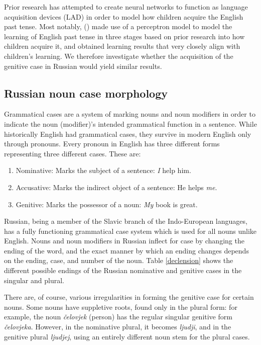 \documentclass[11pt,a4paper]{article}
\newcommand{\citenp}[1]{\citeauthor{#1} (\citeyear{#1})}
\begin{document}
Prior research has attempted to create neural networks to function as
language acquisition devices (LAD) in order to model how children acquire
the English past tense. Most notably, \citenp{RMcC}
made use of a perceptron model to model the learning of English past
tense in three stages based on prior research into how children
acquire it, and obtained learning results that very closely
align with children's learning. We therefore investigate whether
the acquisition of the genitive case in Russian would yield similar results.

\subsection{Russian noun case morphology}

Grammatical cases are a system of marking nouns and noun modifiers in order
to indicate the noun (modifier)'s intended grammatical function in a sentence.
While historically English had grammatical cases, they survive in modern English
only through pronouns. Every pronoun in English has three different forms representing
three different cases. These are:

\begin{enumerate}
    \item Nominative: Marks the subject of a sentence: \emph{I} help him.
    \item Accusative: Marks the indirect object of a sentence: He helps \emph{me}.
    \item Genitive: Marks the possessor of a noun: \emph{My} book is great.
\end{enumerate}

Russian, being a member of the Slavic branch of the Indo-European languages,
has a fully functioning grammatical case system which is used for all nouns
unlike English. Nouns and noun modifiers in Russian inflect for case
by changing the ending of the word, and the exact manner by which an ending
changes depends on the ending, case, and number of the noun. Table \ref{declension} shows 
the different possible endings of the Russian nominative and genitive cases in 
the singular and plural. 

There are, of course, various irregularities in forming the genitive case
for certain nouns. Some nouns have suppletive roots, found only in the
plural form: for example, the noun \emph{\v{c}elovjek} (person) has the regular singular 
genitive form \emph{\v{c}elovjeka}. However, in the nominative plural, it becomes
\emph{ljudji}, and in the genitive plural \emph{ljudjej}, using an entirely different
noun stem for the plural cases.
\end{document}
